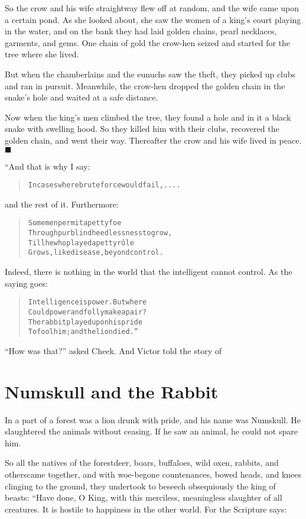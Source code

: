 \documentclass[article, twoside, 14pt]{memoir}
\newcommand{\qed}{\hfill \ensuremath{\blacksquare}}
\renewenvironment{verbatim}{%
\begin{quote}%
\vskip -10pt%
\begin{alltt}\normalfont\large}{\end{alltt}%
\end{quote}%
\vskip -10pt
} %
\begin{document}
So the crow and his wife straightway flew off at random, and the
wife came upon a certain pond. As she looked about, she saw the
women of a king's court playing in the water, and on the bank they
had laid golden chains, pearl necklaces, garments, and gems. One
chain of gold the crow-hen seized and started for the tree where
she lived.

But when the chamberlains and the eunuchs saw the theft, they
picked up clubs and ran in pursuit. Meanwhile, the crow-hen dropped
the golden chain in the snake's hole and waited at a safe
distance.

Now when the king's men climbed the tree, they found a hole and in
it a black snake with swelling hood. So they killed him with their
clubs, recovered the golden chain, and went their way. Thereafter
the crow and his wife lived in peace.\hyperref[s8]{\qed}

“And that is why I say:

\begin{verbatim}
In cases where brute force would fail, ....
\end{verbatim}
and the rest of it. Furthermore:

\begin{verbatim}
Some men permit a petty foe
Through purblind heedlessness to grow,
Till he who played a petty rôle
Grows, like disease, beyond control.
\end{verbatim}
Indeed, there is nothing in the world that the intelligent cannot
control. As the saying goes:

\begin{verbatim}
Intelligence is power. But where
Could power and folly make a pair?
The rabbit played upon his pride
To fool him; and the lion died.”
\end{verbatim}
``How was that?'' asked Cheek. And Victor told the story of

\chapter{Numskull and the Rabbit}

\label{s10}

In a part of a forest was a lion drunk with pride, and his name was
Numskull. He slaughtered the animals without ceasing. If he saw an
animal, he could not spare him.

So all the natives of the forest{\textemdash}deer, boars, buffaloes, wild
oxen, rabbits, and others{\textemdash}came together, and with woe-begone
countenances, bowed heads, and knees clinging to the ground, they
undertook to beseech obsequiously the king of beasts: “Have done, O
King, with this merciless, meaningless slaughter of all creatures.
It is hostile to happiness in the other world. For the Scripture
says:
\end{document}
